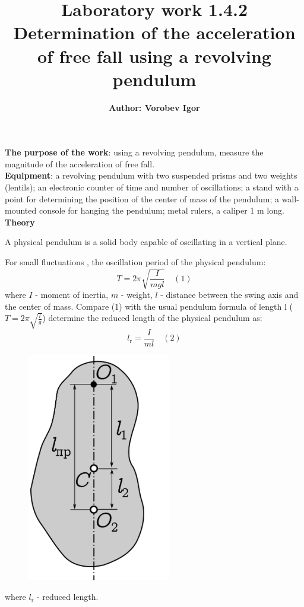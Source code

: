 \documentclass[12pt]{article}
\title{Laboratory work 1.4.2\\Determination of the acceleration of free fall using a revolving pendulum}
\author{\textbf{Author: Vorobev Igor}}
\begin{document}
\maketitle
\textbf{The purpose of the work}: using a revolving pendulum, measure the magnitude of the acceleration of free fall.\\

\textbf{Equipment}: a revolving pendulum with two suspended prisms and two weights (lentils); an electronic counter of time and number of oscillations; a stand with a point for determining the position of the center of mass of the pendulum; a wall-mounted console for hanging the pendulum; metal rulers, a caliper 1 m long.\\

\textbf{\large Theory}


A physical pendulum is a solid body capable of oscillating in a vertical plane. 

For small fluctuations , the oscillation period of the physical pendulum: $$T = 2\pi\sqrt{\frac{I}{mgl}}\quad (1)$$ where $I$ - moment of inertia, $m$ - weight, $l$ - distance between the swing axis and the center of mass. 
Compare (1) with the usual pendulum formula of length l ($T = 2\pi\sqrt{\frac{l}{g}}$) determine the reduced length of the physical pendulum as: $$l_{\text{r}} = \frac{I}{ml} \quad (2)$$

\begin{figure}[h!]
    \centering
    \includegraphics{Рис.1.png}
\end{figure}

where $l_{\text{r}}$ - reduced length.\\
\end{document}
